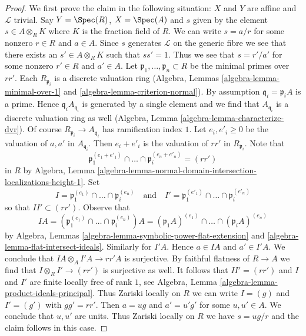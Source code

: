 \begin{proof}
\medskip\noindent
We first prove the claim in the following situation:
$X$ and $Y$ are affine and $\mathcal{L}$ trivial. Say $Y = \Spec(R)$,
$X = \Spec(A)$ and $s$ given by the element $s \in A \otimes_R K$
where $K$ is the fraction field of $R$. We can write $s = a/r$
for some nonzero $r \in R$ and $a \in A$. Since $s$ generates $\mathcal{L}$
on the generic fibre we see that there exists an $s' \in A \otimes_R K$
such that $ss' = 1$. Thus we see that $s = r'/a'$ for some
nonzero $r' \in R$ and $a' \in A$. Let
$\mathfrak p_1, \ldots, \mathfrak p_n \subset R$
be the minimal primes over $rr'$. Each $R_{\mathfrak p_i}$
is a discrete valuation ring
(Algebra, Lemmas \ref{algebra-lemma-minimal-over-1} and
\ref{algebra-lemma-criterion-normal}). By assumption
$\mathfrak q_i = \mathfrak p_i A$ is a prime. Hence
$\mathfrak q_i A_{\mathfrak q_i}$ is generated by a single element
and we find that $A_{\mathfrak q_i}$ is a discrete valuation ring as
well (Algebra, Lemma \ref{algebra-lemma-characterize-dvr}). Of course
$R_{\mathfrak p_i} \to A_{\mathfrak q_i}$ has ramification index $1$.
Let $e_i, e'_i \geq 0$ be the  valuation of $a, a'$ in $A_{\mathfrak q_i}$.
Then $e_i + e'_i$ is the valuation of $rr'$ in $R_{\mathfrak p_i}$. Note that
$$
\mathfrak p_1^{(e_1 + e'_1)} \cap \ldots \cap \mathfrak p_i^{(e_n + e'_n)} =
(rr')
$$
in $R$ by Algebra, Lemma
\ref{algebra-lemma-normal-domain-intersection-localizations-height-1}.
Set
$$
I = \mathfrak p_1^{(e_1)} \cap \ldots \cap \mathfrak p_i^{(e_n)}
\quad\text{and}\quad
I' = \mathfrak p_1^{(e'_1)} \cap \ldots \cap \mathfrak p_i^{(e'_n)}
$$
so that $II' \subset (rr')$. Observe that
$$
IA = 
(\mathfrak p_1^{(e_1)} \cap \ldots \cap \mathfrak p_i^{(e_n)})A =
(\mathfrak p_1A)^{(e_1)} \cap \ldots \cap (\mathfrak p_i A)^{(e_n)}
$$
by Algebra, Lemmas \ref{algebra-lemma-symbolic-power-flat-extension} and
\ref{algebra-lemma-flat-intersect-ideals}. Similarly for $I'A$. Hence
$a \in IA$ and $a' \in I'A$.
We conclude that $IA \otimes_A I'A \to rr'A$ is surjective.
By faithful flatness of $R \to A$ we find that
$I \otimes_R I' \to (rr')$ is surjective as well.
It follows that $II' = (rr')$ and $I$ and $I'$ are finite locally
free of rank $1$, see
Algebra, Lemma \ref{algebra-lemma-product-ideals-principal}.
Thus Zariski locally on $R$ we can write $I = (g)$ and $I' = (g')$
with $gg' = rr'$. Then $a = ug$ and $a' = u'g'$ for some $u, u' \in A$.
We conclude that $u, u'$ are units. Thus Zariski locally on $R$
we have $s = ug/r$ and the claim follows in this case.


\end{proof}
